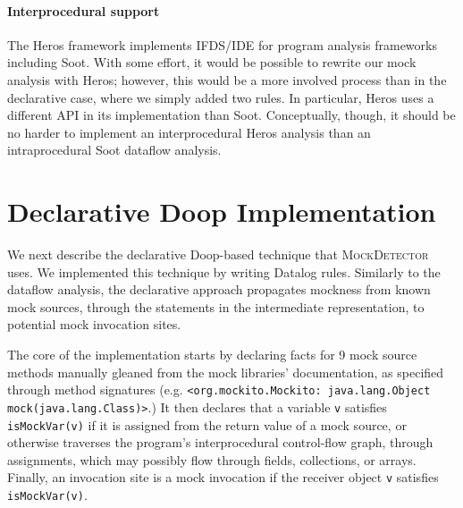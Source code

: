 \paragraph{Interprocedural support} The Heros framework\cite{bodden12:_inter_proced_data_flow_analy} implements IFDS/IDE for program analysis frameworks including Soot. With some effort, it would be possible to rewrite our mock analysis with Heros; however, this would be a more involved process than in the declarative case, where we simply added two rules. In particular, Heros uses a different API in its implementation than Soot. Conceptually, though, it should be no harder to implement an interprocedural Heros analysis than an intraprocedural Soot dataflow analysis.



\section{Declarative Doop Implementation}
\label{sec:dec-doop}
We next describe the declarative Doop-based technique that \textsc{MockDetector} uses. We implemented this technique by writing Datalog rules. Similarly to the dataflow analysis, the declarative approach propagates mockness from known mock sources, through the statements in the intermediate representation, to potential mock invocation sites.

The core of the implementation starts by declaring facts for 9 mock source methods manually gleaned from the mock libraries' documentation, as specified through method signatures (e.g. 
\texttt{<org.mockito.Mockito: java.lang.Object mock(java.lang.Class)>}.)
It then declares that a variable {\tt v} satisfies \verb+isMockVar(v)+ if it is assigned from the return value of a mock source, or otherwise traverses the program's interprocedural control-flow graph, through assignments, which may possibly flow through fields, collections, or arrays. Finally, an invocation site is a mock invocation if the receiver object {\tt v} satisfies \verb+isMockVar(v)+.

